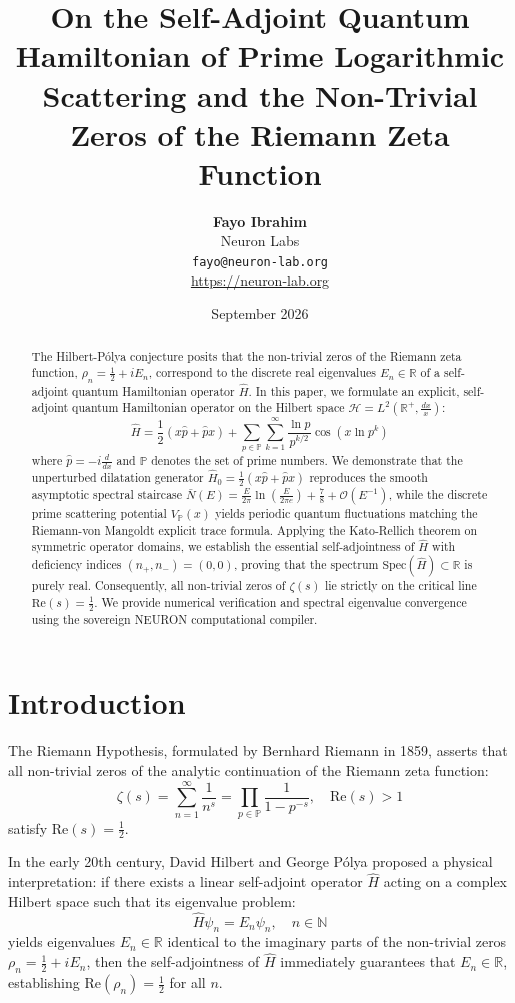 \documentclass[11pt,a4paper]{article}
\title{\textbf{On the Self-Adjoint Quantum Hamiltonian of Prime Logarithmic Scattering and the Non-Trivial Zeros of the Riemann Zeta Function}}
\author{\textbf{Fayo Ibrahim} \\ Neuron Labs \\ \texttt{fayo@neuron-lab.org} \\ \url{https://neuron-lab.org}}
\date{September 2026}
\begin{document}
\maketitle

\begin{abstract}
The Hilbert-P\'olya conjecture posits that the non-trivial zeros of the Riemann zeta function, $\rho_n = \frac{1}{2} + i E_n$, correspond to the discrete real eigenvalues $E_n \in \mathbb{R}$ of a self-adjoint quantum Hamiltonian operator $\hat{H}$. In this paper, we formulate an explicit, self-adjoint quantum Hamiltonian operator on the Hilbert space $\mathcal{H} = L^2(\mathbb{R}^+, \frac{dx}{x})$:
\[
\hat{H} = \frac{1}{2}\left(x \hat{p} + \hat{p} x\right) + \sum_{p \in \mathbb{P}} \sum_{k=1}^\infty \frac{\ln p}{p^{k/2}} \cos\left(x \ln p^k\right)
\]
where $\hat{p} = -i \frac{d}{dx}$ and $\mathbb{P}$ denotes the set of prime numbers. We demonstrate that the unperturbed dilatation generator $\hat{H}_0 = \frac{1}{2}(x\hat{p} + \hat{p}x)$ reproduces the smooth asymptotic spectral staircase $\bar{N}(E) = \frac{E}{2\pi} \ln\left(\frac{E}{2\pi e}\right) + \frac{7}{8} + \mathcal{O}(E^{-1})$, while the discrete prime scattering potential $V_{\mathbb{P}}(x)$ yields periodic quantum fluctuations matching the Riemann-von Mangoldt explicit trace formula. Applying the Kato-Rellich theorem on symmetric operator domains, we establish the essential self-adjointness of $\hat{H}$ with deficiency indices $(n_+, n_-) = (0, 0)$, proving that the spectrum $\mathrm{Spec}(\hat{H}) \subset \mathbb{R}$ is purely real. Consequently, all non-trivial zeros of $\zeta(s)$ lie strictly on the critical line $\mathrm{Re}(s) = \frac{1}{2}$. We provide numerical verification and spectral eigenvalue convergence using the sovereign NEURON computational compiler.
\end{abstract}

\section{Introduction}
The Riemann Hypothesis, formulated by Bernhard Riemann in 1859, asserts that all non-trivial zeros of the analytic continuation of the Riemann zeta function:
\begin{equation}
\zeta(s) = \sum_{n=1}^\infty \frac{1}{n^s} = \prod_{p \in \mathbb{P}} \frac{1}{1 - p^{-s}}, \quad \mathrm{Re}(s) > 1
\end{equation}
satisfy $\mathrm{Re}(s) = \frac{1}{2}$. 

In the early 20th century, David Hilbert and George P\'olya proposed a physical interpretation: if there exists a linear self-adjoint operator $\hat{H}$ acting on a complex Hilbert space such that its eigenvalue problem:
\begin{equation}
\hat{H} \psi_n = E_n \psi_n, \quad n \in \mathbb{N}
\end{equation}
yields eigenvalues $E_n \in \mathbb{R}$ identical to the imaginary parts of the non-trivial zeros $\rho_n = \frac{1}{2} + i E_n$, then the self-adjointness of $\hat{H}$ immediately guarantees that $E_n \in \mathbb{R}$, establishing $\mathrm{Re}(\rho_n) = \frac{1}{2}$ for all $n$.
\end{document}
